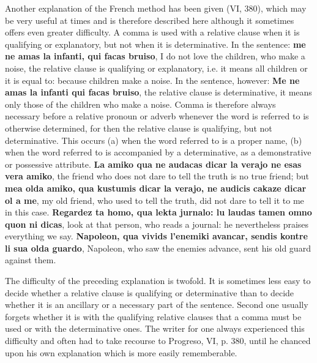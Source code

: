 Another explanation of the French method has been given (VI, 380), which may be very useful at times and is therefore described here although it sometimes offers even greater difficulty. A comma is used with a relative clause when it is qualifying or explanatory, but not when it is determinative. In the sentence: \textbf{me ne amas la infanti, qui facas bruiso}, I do not love the children, who make a noise, the relative clause is qualifying or explanatory, i.e. it means all children or it is equal to: because children make a noise. In the sentence, however: \textbf{Me ne amas la infanti qui facas bruiso}, the relative clause is determinative, it means only those of the children who make a noise. Comma is therefore always necessary before a relative pronoun or adverb whenever the word is referred to is otherwise determined, for then the relative clause is qualifying, but not determinative. This occurs (a) when the word referred to is a proper name, (b) when the word referred to is accompanied by a determinative, as a demonstrative or possessive attribute. \textbf{La amiko qua ne audacas dicar la verajo ne esas vera amiko}, the friend who does not dare to tell the truth is no true friend; but \textbf{mea olda amiko, qua kustumis dicar la verajo, ne audicis cakaze dicar ol a me}, my old friend, who used to tell the truth, did not dare to tell it to me in this case. \textbf{Regardez ta homo, qua lekta jurnalo: lu laudas tamen omno quon ni dicas}, look at that person, who reads a journal: he nevertheless praises everything we say. \textbf{Napoleon, qua vivids l'enemiki avancar, sendis kontre li sua olda guardo}, Napoleon, who saw the enemies advance, sent his old guard against them.

The difficulty of the preceding explanation is twofold. It is sometimes less easy to decide whether a relative clause is qualifying or determinative than to decide whether it is an ancillary or a necessary part of the sentence. Second one usually forgets whether it is with the qualifying relative clauses that a comma must be used or with the determinative ones. The writer for one always experienced this difficulty and often had to take recourse to Progreso, VI, p. 380, until he chanced upon his own explanation which is more easily rememberable.

